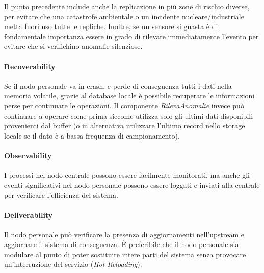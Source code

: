 \documentclass[a4paper,11pt,oneside, table]{article}
\begin{document}
Il punto precedente include anche la replicazione in pi\`u zone di rischio diverse, per evitare che una catastrofe ambientale o un incidente nucleare/industriale metta fuori uso tutte le repliche.
Inoltre, se un sensore si guasta \`e di fondamentale importanza essere in grado di rilevare immediatamente l'evento per evitare che si verifichino anomalie silenziose.

\paragraph{Recoverability}

Se il nodo personale va in crash, e perde di conseguenza tutti i dati nella memoria volatile, grazie al database locale \`e possibile recuperare le informazioni perse per continuare le operazioni. Il componente \textit{RilevaAnomalie} invece pu\`o continuare a operare come prima siccome utilizza solo gli ultimi dati disponibili provenienti dal buffer (o in alternativa utilizzare l'ultimo record nello storage locale se il dato \`e a bassa frequenza di campionamento).

\paragraph{Observability}

I processi nel nodo centrale possono essere facilmente monitorati, ma anche gli eventi significativi nel nodo personale possono essere loggati e inviati alla centrale per verificare l'efficienza del sistema.

\paragraph{Deliverability}

Il nodo personale pu\`o verificare la presenza di aggiornamenti nell'upstream e aggiornare il sistema di conseguenza. \`E preferibile che il nodo personale sia modulare al punto di poter sostituire intere parti del sistema senza provocare un'interruzione del servizio (\textit{Hot Reloading}).
\end{document}
